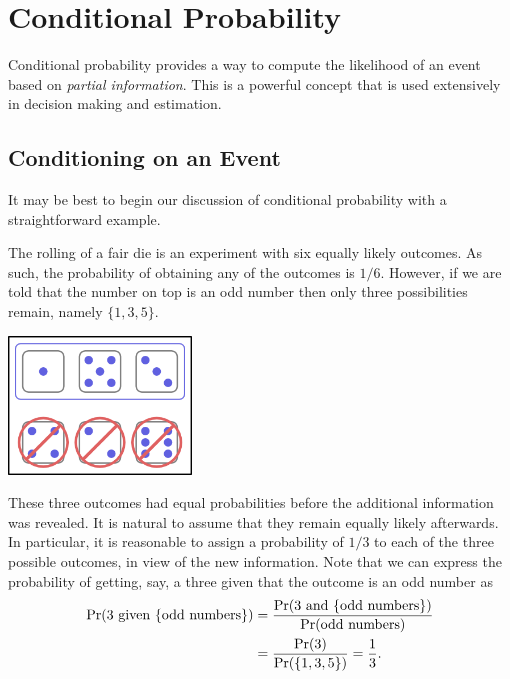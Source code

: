 \chapter{Conditional Probability}
\label{chapter:ConditionalProbability}

Conditional probability provides a way to compute the likelihood of an event based on \emph{partial information}.
This is a powerful concept that is used extensively in decision making and estimation.


\section{Conditioning on an Event}

It may be best to begin our discussion of conditional probability with a straightforward example.

\begin{example}
The rolling of a fair die is an experiment with six equally likely outcomes.
As such, the probability of obtaining any of the outcomes is $1/6$.
However, if we are told that the number on top is an odd number then only three possibilities remain, namely $\{1, 3, 5 \}$.

\begin{center}
\includegraphics[height=3.675cm]{Figures/3Chapter/condevent}
\end{center}

These three outcomes had equal probabilities before the additional information was revealed.
It is natural to assume that they remain equally likely afterwards.
In particular, it is reasonable to assign a probability of $1/3$ to each of the three possible outcomes, in view of the new information.
Note that we can express the probability of getting, say, a three given that the outcome is an odd number as
\begin{equation*}
\begin{split}
\Pr (\text{3 given } \{ \text{odd numbers} \})
&= \frac{\Pr (\text{3 and } \{ \text{odd numbers} \})}
{\Pr (\text{odd numbers})} \\
&= \frac{\Pr(3)}{\Pr (\{1,3,5\})} = \frac{1}{3} .
\end{split}
\end{equation*}
\end{example}

